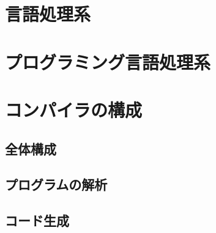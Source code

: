 \documentclass{jbook}
\begin{document}
\section{言語処理系}
\section{プログラミング言語処理系}
\section{コンパイラの構成}
\subsection{全体構成}
\subsection{プログラムの解析}
\subsection{コード生成}
\end{document}
